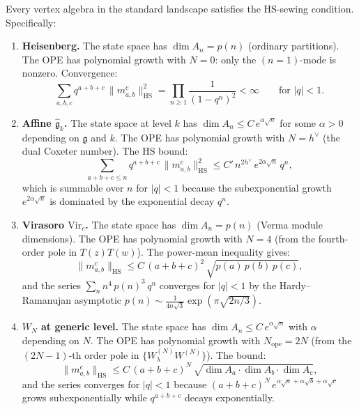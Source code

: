 \begin{theorem}
Every vertex algebra in the standard landscape satisfies the HS-sewing
condition. Specifically:

\begin{enumerate}[leftmargin=2.4em]
\item \textbf{Heisenberg.}
The state space has $\dim A_n = p(n)$ (ordinary partitions).
The OPE has polynomial growth with $N = 0$: only the
$(n=1)$-mode is nonzero. Convergence:
\[
\sum_{a,b,c} q^{a+b+c}\,\|m_{a,b}^c\|_{\mathrm{HS}}^2
=
\prod_{n \ge 1} \frac{1}{(1-q^n)^2}
< \infty
\qquad\text{for }|q| < 1.
\]

\item \textbf{Affine $\widehat{\mathfrak{g}}_k$.}
The state space at level $k$ has
$\dim A_n \le C\, e^{\alpha\sqrt{n}}$ for some $\alpha > 0$
depending on $\mathfrak{g}$ and $k$. The OPE has polynomial growth
with $N = h^\vee$ (the dual Coxeter number).
The HS bound:
\[
\sum_{a+b+c \le n} q^{a+b+c}\,\|m_{a,b}^c\|_{\mathrm{HS}}^2
\le
C'\,n^{2h^\vee}\,e^{2\alpha\sqrt{n}}\, q^n,
\]
which is summable over $n$ for $|q| < 1$ because the subexponential
growth $e^{2\alpha\sqrt{n}}$ is dominated by the exponential decay $q^n$.

\item \textbf{Virasoro $\mathrm{Vir}_c$.}
The state space has $\dim A_n = p(n)$ (Verma module dimensions).
The OPE has polynomial growth with $N = 4$ (from the fourth-order
pole in $T(z)T(w)$). The power-mean inequality gives:
\[
\|m_{a,b}^c\|_{\mathrm{HS}}
\le
C\,(a+b+c)^2\,\sqrt{p(a)\,p(b)\,p(c)},
\]
and the series $\sum_{n} n^4\,p(n)^3\,q^n$ converges for $|q|<1$
by the Hardy--Ramanujan asymptotic $p(n) \sim
\frac{1}{4n\sqrt{3}}\exp(\pi\sqrt{2n/3})$.

\item \textbf{$W_N$ at generic level.}
The state space has $\dim A_n \le C\,e^{\alpha\sqrt{n}}$ with $\alpha$
depending on $N$. The OPE has polynomial growth with $N_{\mathrm{ope}} = 2N$
(from the $(2N-1)$-th order pole in $\{W^{(N)}_\lambda W^{(N)}\}$).
The bound:
\[
\|m_{a,b}^c\|_{\mathrm{HS}}
\le
C\,(a+b+c)^N\,\sqrt{\dim A_a \cdot \dim A_b \cdot \dim A_c},
\]
and the series converges for $|q|<1$ because
$(a+b+c)^N\,e^{\alpha\sqrt{a}+\alpha\sqrt{b}+\alpha\sqrt{c}}$
grows subexponentially while $q^{a+b+c}$ decays exponentially.
\end{enumerate}
\end{theorem}

